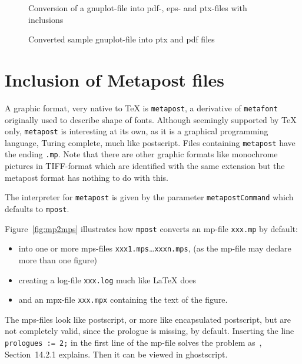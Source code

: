 \documentclass[12pt]{book}
\newcommand{\gls}[1]{#1}
\begin{document}
\begin{figure}[htb]
\begin{center}
\end{center}
\caption{\label{fig:gp2pdf}Conversion of a gnuplot-file 
into pdf-, eps- and ptx-files with inclusions}
\end{figure}

\begin{figure}[htb]
\begin{center}
\end{center}
\caption{\label{fig:gnuplot}
Converted sample gnuplot-file into ptx and pdf files }
\end{figure}


\section{Inclusion of Metapost files}\label{sec:metapost}

A graphic format, very native to TeX is \texttt{metapost}, 
a derivative of \texttt{metafont} originally used to describe shape of fonts. 
Although seemingly supported by \TeX{} only, 
\texttt{metapost} is interesting at its own, 
as it is a graphical programming language, 
Turing complete, much like postscript. 
Files containing \texttt{metapost} have the ending \texttt{.mp}. 
Note that there are other graphic formats 
like monochrome pictures in TIFF-format 
which are identified with the same extension 
but the metapost format has nothing to do with this. 

The interpreter for \texttt{metapost} 
is given by the parameter \texttt{metapostCommand} 
which defaults to \texttt{mpost}. 


Figure~\ref{fig:mp2mps} illustrates how \texttt{mpost} converts an \gls{mp}-file 
\texttt{xxx.mp} by default: 
%
\begin{itemize}
\item
into one or more \gls{mps}-files \texttt{xxx1.mps}\dots \texttt{xxxn.mps}, 
(as the mp-file may declare more than one figure) 
\item
creating a log-file \texttt{xxx.log} much like \LaTeX{} does 
\item
and an \gls{mpx}-file \texttt{xxx.mpx} containing the text of the figure. 
\end{itemize}

The mps-files look like postscript, or more like encapsulated postscript, 
but are not completely valid, since the prologue is missing, by default. 
Inserting the line \texttt{prologues := 2;} in the first line of the mp-file 
solves the problem as~\cite{MPost}, Section~14.2.1 explains. 
Then it can be viewed in ghostscript. 
\end{document}
